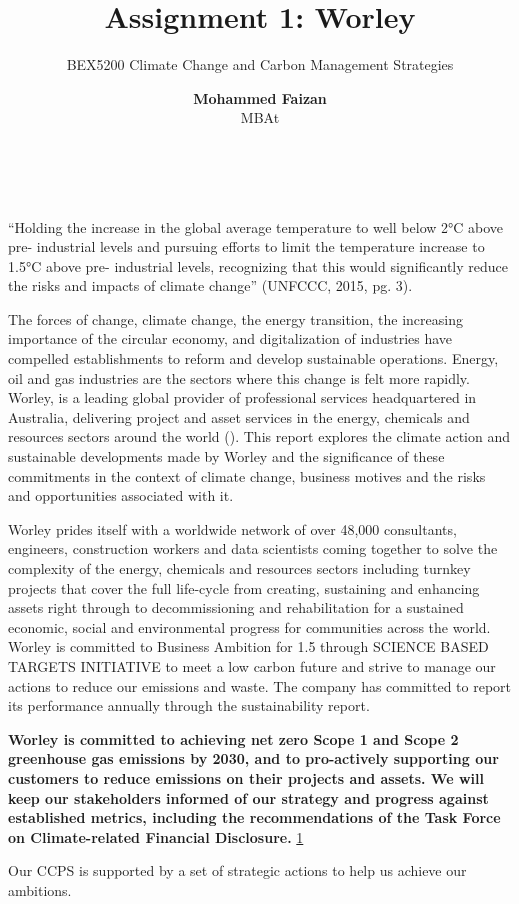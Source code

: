 \documentclass[11pt,a4paper,]{article}
\title{Assignment 1: Worley}
\subtitle{BEX5200 Climate Change and Carbon Management Strategies}
\author{\sf\Large\textbf{ Mohammed Faizan}\\ {\sf\large MBAt\\[0.5cm]}}
\date{\sf\Date~\Month~\Year}
\makeatletter
\def\titlepage{\front{\expandafter{\@title}}{\@author}{\@organization}}
\makeatother
\begin{document}
\titlepage

{
\setcounter{tocdepth}{2}
\tableofcontents
}
``Holding the increase in the global average temperature to well below 2°C above pre- industrial levels and pursuing efforts to limit the temperature increase to 1.5°C above pre- industrial levels, recognizing that this would significantly reduce the risks and impacts of climate change'' (UNFCCC, 2015, pg. 3).

The forces of change, climate change, the energy transition, the increasing importance of the circular economy, and digitalization of industries have compelled establishments to reform and develop sustainable operations. Energy, oil and gas industries are the sectors where this change is felt more rapidly. Worley, is a leading global provider of professional services headquartered in Australia, delivering project and asset services in the energy, chemicals and resources sectors around the world (\textcite{sustainabilityreport2020}). This report explores the climate action and sustainable developments made by Worley and the significance of these commitments in the context of climate change, business motives and the risks and opportunities associated with it.

Worley prides itself with a worldwide network of over 48,000 consultants, engineers, construction workers and data scientists coming together to solve the complexity of the energy, chemicals and resources sectors including turnkey projects that cover the full life-cycle from creating, sustaining and enhancing assets right through to decommissioning and rehabilitation for a sustained economic, social and environmental progress for communities across the world. Worley is committed to Business Ambition for 1.5 through SCIENCE BASED TARGETS INITIATIVE to meet a low carbon future and strive to manage our actions to reduce our emissions and waste. The company has committed to report its performance annually through the sustainability report.

\textbf{Worley is committed to achieving net zero Scope 1 and Scope 2 greenhouse gas emissions by 2030, and to pro-actively supporting our customers to reduce emissions on their projects and assets. We will keep our stakeholders informed of our strategy and progress against established metrics, including the recommendations of the Task Force on Climate-related Financial Disclosure.} \href{https://www.worley.com/sustainability/environment/climate-change}{1}

Our CCPS is supported by a set of strategic actions to help us achieve our ambitions.
\end{document}
